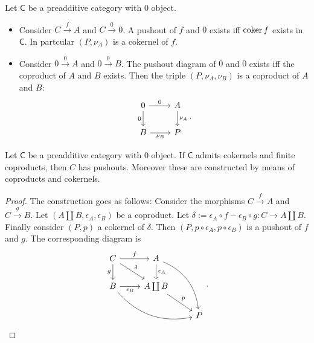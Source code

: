\begin{ex}
	Let $\mathsf{C}$ be a preadditive category with $0$ object.
	\begin{itemize}
		\item Consider $C \xrightarrow{f} A$ and $C \xrightarrow{0} 0$.
			A pushout of $f$ and $0$ exists iff $\operatorname{coker} f$ exists in $\mathsf{C}$.
			In partcular $\left(P, \nu_A \right)$ is a cokernel of $f$.
		\item Consider $0 \xrightarrow{0} A$ and $0 \xrightarrow{0} B$.
			The pushout diagram of $0$ and $0$ exists iff the coproduct of $A$ and $B$ exists.
			Then the triple $ \left(P, \nu_A, \nu_B\right)$ is a coproduct of $A$ and $B$:
			\begin{equation}
			\begin{tikzcd}
				0 \arrow[r, "0", rightarrow] \arrow[d, "0"', rightarrow] &
				A \arrow[d, "\nu_A", rightarrow] \\
				B \arrow[r, "\nu_B"', rightarrow] &
				P
			\end{tikzcd}
			.\end{equation} 
	\end{itemize}
\end{ex} 

\begin{prop}
	Let $\mathsf{C}$ be a preadditive category with $0$ object.
	If $\mathsf{C}$ admits cokernels and finite coproducts, then $C$ has pushouts.
	Moreover these are constructed by means of coproducts and cokernels.
\end{prop} 
\begin{proof}
	The construction goes as follows:
	Consider the morphisms $C \xrightarrow{f} A$ and $C \xrightarrow{g} B$.
	Let $\left(A \coprod B, \epsilon_A, \epsilon_B\right)$ be a coproduct.
	Let $\delta := \epsilon_A \circ f - \epsilon_B \circ g:C \to A \coprod B$.
	Finally consider $\left(P, p\right)$ a cokernel of $\delta$.
	Then $\left(P, p \circ \epsilon_A, p \circ \epsilon_B\right)$ is a pushout of $f$ and $g$.
	The corresponding diagram is
	\begin{equation}
	\begin{tikzcd}
		C \arrow[rd, "\delta", rightarrow] \arrow[r, "f", rightarrow] \arrow[d, "g"', rightarrow] & 
		A \arrow[d, "\epsilon_A", rightarrow] \arrow[ddr, "", rightarrow, bend left] & \\
		B \arrow[r, "\epsilon_B"', rightarrow] \arrow[rrd, "", rightarrow, bend right] &
		A \coprod B \arrow[rd, "p", rightarrow] & \\
		& & P
	\end{tikzcd}
	.\end{equation} 
\end{proof}


